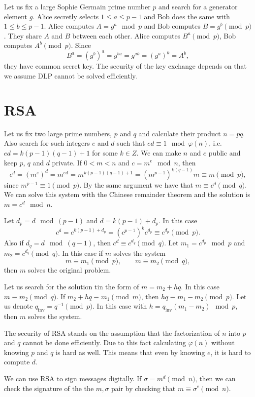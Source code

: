 \documentclass{article}
\begin{document}
Let us fix a large Sophie Germain prime number $p$ and search for a generator element $g$.
Alice secretly selects $1 \le a \le p-1$ and Bob does the same with $1 \le b \le p-1$.
Alice computes $A = g^a \mod p$ and Bob computes $B = g^b \pmod p$.
They share $A$ and $B$ between each other.
Alice computes $B^a \pmod p$, Bob computes $A^b \pmod p$.
Since
\[
    B^a = (g^b)^a = g^{ba} = g^{ab} = (g^a)^b = A^b,
\]
they have common secret key.
The security of the key exchange depends on that we assume DLP cannot be solved efficiently.

\section{RSA}

Let us fix two large prime numbers, $p$ and $q$ and calculate their product $n=pq$.
Also search for such integers $e$ and $d$ such that $ed \equiv 1 \mod \varphi(n)$, i.e. $ed = k(p-1)(q-1) + 1$ for some $k \in Z$.
We can make $n$ and $e$ public and keep $p$, $q$ and $d$ private.
If $0 < m < n$ and $c = m^e \mod n$, then
\[
    c^d = (m^e)^d = m^{ed} = m^{k(p-1)(q-1)+1} = (m^{p-1})^{k(q-1)}m \equiv m \pmod{p},
\]
since $m^{p-1} \equiv 1 \pmod{p}$. By the same argument we have that $m \equiv c^d \pmod{q}$.
We can solve this system with the Chinese remainder theorem and the solution is $m = c^d \mod n$.

Let $d_p = d \mod (p-1)$ and $d = k(p-1) + d_p$. In this case
\[
    c^d = c^{k(p-1)+d_p} = (c^{p-1})^k c^{d_p} \equiv c^{d_p} \pmod{p}.
\]
Also if $d_q = d \mod (q-1)$, then $c^d \equiv c^{d_q} \pmod{q}$.
Let $m_1 = c^{d_p} \mod p$ and $m_2 = c^{d_q} \pmod q$.
In this case if $m$ solves the system
\[
    m \equiv m_1 \pmod{p}, \qquad m \equiv m_2 \pmod{q},
\]
then $m$ solves the original problem.

Let us search for the solution tin the form of $m=m_2 + hq$.
In this case $m \equiv m_2 \pmod{q}$.
If $m_2 + hq \equiv m_1 \pmod{m}$, then $hq \equiv m_1 - m_2 \pmod{p}$.
Let us denote $q_{\mathrm{inv}}=q^{-1} \pmod{p}$.
In this case with $h = q_{\mathrm{inv}}(m_1 - m_2) \mod p$, then $m$ solves the system.

The security of RSA stands on the assumption that the factorization of $n$ into $p$ and $q$ cannot be done efficiently.
Due to this fact calculating $\varphi(n)$ without knowing $p$ and $q$ is hard as well.
This means that even by knowing $e$, it is hard to compute $d$.

We can use RSA to sign messages digitally.
If $\sigma = m^d \pmod n$, then we can check the signature of the the $m, \sigma$ pair by checking that $m \equiv \sigma^e \pmod{n}$.
\end{document}
